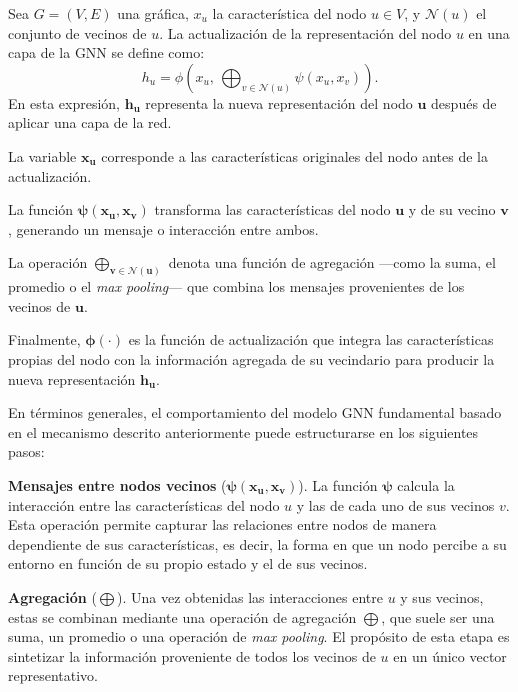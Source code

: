 \begin{definition}
    Sea $G = (V, E)$ una gráfica, $x_u$ la característica del nodo $u \in V$, y $\mathcal{N}(u)$ el conjunto de vecinos de $u$. La actualización de la representación del nodo $u$ en una capa de la GNN se define como:
    \[
        h_u = \phi\!\left(x_u,\, \bigoplus_{v \in \mathcal{N}(u)} \psi(x_u, x_v)\right).
    \]
    \noindent En esta expresión, $\boldsymbol{h_u}$ representa la nueva representación del nodo $\boldsymbol{u}$ después de aplicar una capa de la red.

    \noindent La variable $\boldsymbol{x_u}$ corresponde a las características originales del nodo antes de la actualización.

    \noindent La función $\boldsymbol{\psi}(\boldsymbol{x_u}, \boldsymbol{x_v})$ transforma las características del nodo $\boldsymbol{u}$ y de su vecino $\boldsymbol{v}$, generando un mensaje o interacción entre ambos.

    \noindent La operación $\boldsymbol{\bigoplus_{v \in \mathcal{N}(u)}}$ denota una función de agregación —como la suma, el promedio o el \emph{max pooling}— que combina los mensajes provenientes de los vecinos de $\boldsymbol{u}$.

    \noindent Finalmente, $\boldsymbol{\phi}(\cdot)$ es la función de actualización que integra las características propias del nodo con la información agregada de su vecindario para producir la nueva representación $\boldsymbol{h_u}$.
\end{definition}

En términos generales, el comportamiento del modelo GNN fundamental basado en el mecanismo descrito anteriormente puede estructurarse en los siguientes pasos:

\textbf{Mensajes entre nodos vecinos} ($\boldsymbol{\psi(x_u, x_v)}$).
La función $\boldsymbol{\psi}$ calcula la interacción entre las características del nodo $u$ y las de cada uno de sus vecinos $v$. Esta operación permite capturar las relaciones entre nodos de manera dependiente de sus características, es decir, la forma en que un nodo percibe a su entorno en función de su propio estado y el de sus vecinos.

\textbf{Agregación} ($\boldsymbol{\bigoplus}$).
Una vez obtenidas las interacciones entre $u$ y sus vecinos, estas se combinan mediante una operación de agregación $\bigoplus$, que suele ser una suma, un promedio o una operación de \emph{max pooling}. El propósito de esta etapa es sintetizar la información proveniente de todos los vecinos de $u$ en un único vector representativo.

